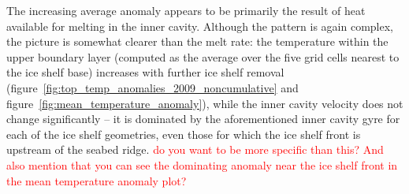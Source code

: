 \documentclass[draft]{agujournal2019}
\newcommand{\red}[1]{\textcolor{red}{#1}}
\begin{document}
The increasing average anomaly appears to be primarily the result of heat available for melting in the inner cavity. Although the pattern is again complex, the picture is somewhat clearer than the melt rate: the temperature within the upper boundary layer (computed as the average over the five grid cells nearest to the ice shelf base) increases with further ice shelf removal (figure~\ref{fig:top_temp_anomalies_2009_noncumulative} and figure~\ref{fig:mean_temperature_anomaly}), while the inner cavity velocity does not change significantly -- it is dominated by the aforementioned inner cavity gyre for each of the ice shelf geometries, even those for which the ice shelf front is upstream of the seabed ridge. \red{do you want to be more specific than this? And also mention that you can see the dominating anomaly near the ice shelf front in the mean temperature anomaly plot?}
\end{document}
